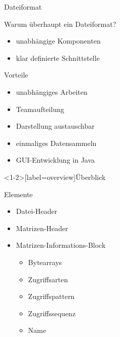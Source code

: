 \begin{frame}{Dateiformat}
	\begin{block}{Warum überhaupt ein Dateiformat?}
		\begin{itemize}
			\item unabhängige Komponenten
			\item klar definierte Schnittstelle
		\end{itemize}
	\end{block}
	\pause
	\begin{block}{Vorteile}
		\begin{itemize}
			\item unabhängiges Arbeiten
			\item Teamaufteilung
			\pause
			\item Darstellung austauschbar
			\item einmaliges Datensammeln
			\pause
			\item GUI-Entwicklung in Java
		\end{itemize}
	\end{block}
\end{frame}

\begin{frame}<1-2>[label=overview]{Überblick}
	\begin{block}{Elemente}
		\begin{itemize}
			\item Datei-Header
			\pause
			\item Matrizen-Header
			\pause
			\item Matrizen-Informations-Block
			\pause
			\begin{itemize}
				\item Bytearrays
				\pause
				\item Zugriffsarten
				\pause
				\item Zugriffspattern
				\pause
				\item Zugriffssequenz
				\pause
				\item Name
			\end{itemize}
		\end{itemize}
	\end{block}
\end{frame}


